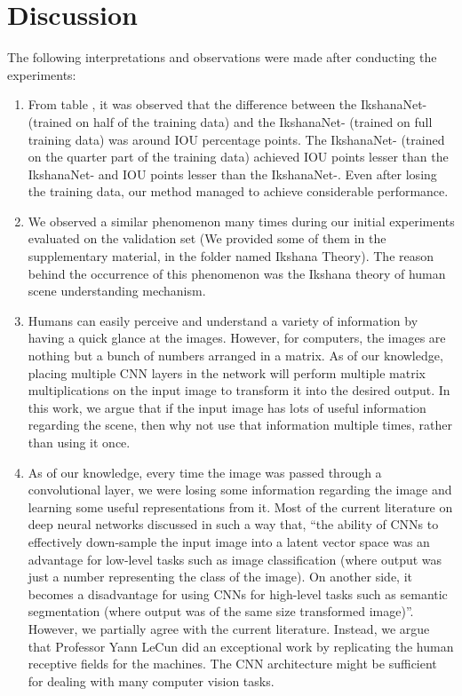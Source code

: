 \documentclass{article}
\begin{document}
\section{Discussion}

The following interpretations and observations were made after conducting the experiments:
\begin{enumerate}
\item From table , it was observed that the difference between the IkshanaNet- (trained on half of the training data) and the IkshanaNet- (trained on full training data) was around  IOU percentage points. 
The IkshanaNet- (trained on the quarter part of the training data) achieved  IOU points lesser than the IkshanaNet- and  IOU points lesser than the IkshanaNet-. Even after losing the training data, our method managed to achieve considerable performance. 
\item We observed a similar phenomenon many times during our initial experiments evaluated on the validation set (We provided some of them in the supplementary material, in the folder named Ikshana Theory). The reason behind the occurrence of this phenomenon was the Ikshana theory of human scene understanding mechanism. 
\item Humans can easily perceive and understand a variety of information by having a quick glance at the images. However, for computers, the images are nothing but a bunch of numbers arranged in a matrix.  As of our knowledge, placing multiple CNN layers in the network will perform multiple matrix multiplications on the input image to transform it into the desired output. In this work, we argue that if the input image has lots of useful information regarding the scene, then why not use that information multiple times, rather than using it once. 
\item As of our knowledge, every time the image was passed through a convolutional layer, we were losing some information regarding the image and learning some useful representations from it. Most of the current literature on deep neural networks discussed in such a way that, ``the ability of CNNs to effectively down-sample the input image into a latent vector space was an advantage for low-level tasks such as image classification (where output was just a number representing the class of the image). On another side, it becomes a disadvantage for using CNNs for high-level tasks such as semantic segmentation (where output was of the same size transformed image)''. However, we partially agree with the current literature. Instead, we argue that Professor Yann LeCun did an exceptional work by replicating the human receptive fields for the machines. The CNN architecture might be sufficient for dealing with many computer vision tasks.

\end{enumerate}
\end{document}
